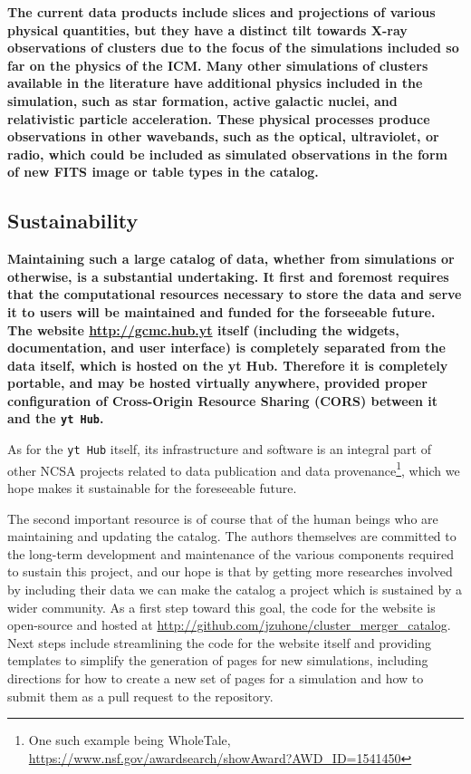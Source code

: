 \documentclass{emulateapj}
\newcommand{\code}[1]{\texttt{#1}}
\begin{document}
{\bf The current data products include slices and projections of various physical quantities, but they have a distinct tilt towards X-ray observations of clusters due to the focus of the simulations included so far on the physics of the ICM. Many other simulations of clusters available in the literature have additional physics included in the simulation, such as star formation, active galactic nuclei, and relativistic particle acceleration. These physical processes produce observations in other wavebands, such as the optical, ultraviolet, or radio, which could be included as simulated observations in the form of new FITS image or table types in the catalog.}

\subsection{Sustainability}\label{sec:sustainability}

{\bf Maintaining such a large catalog of data, whether from simulations or otherwise, is a substantial undertaking. It first and foremost requires that the computational resources necessary to store the data and serve it to users will be maintained and funded for the forseeable future. The website \url{http://gcmc.hub.yt} itself (including the widgets, documentation, and user interface) is completely separated from the data itself, which is hosted on the yt Hub. Therefore it is completely portable, and may be hosted virtually anywhere, provided proper configuration of Cross-Origin Resource Sharing (CORS) between it and the \code{yt Hub}.

As for the \code{yt Hub} itself, its infrastructure and software is an integral part of other NCSA projects related to data publication and data provenance\footnote{One such example being WholeTale, \url{https://www.nsf.gov/awardsearch/showAward?AWD_ID=1541450}}, which we hope makes it sustainable for the foreseeable future.

The second important resource is of course that of the human beings who are maintaining and updating the catalog. The authors themselves are committed to the long-term development and maintenance of the various components required to sustain this project, and our hope is that by getting more researches involved by including their data we can make the catalog a project which is sustained by a wider community. As a first step toward this goal, the code for the website is open-source and hosted at \url{http://github.com/jzuhone/cluster_merger_catalog}. Next steps include streamlining the code for the website itself and providing templates to simplify the generation of pages for new simulations, including directions for how to create a new set of pages for a simulation and how to submit them as a pull request to the repository.} 
\end{document}
